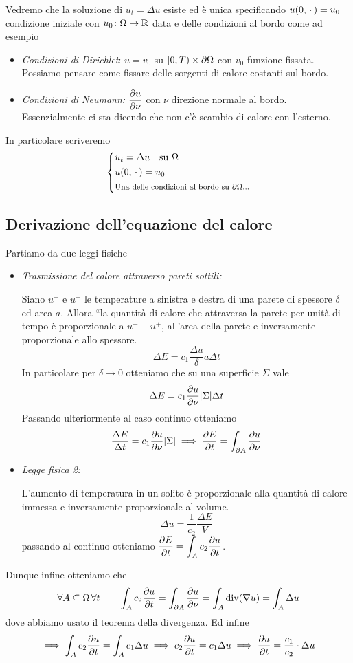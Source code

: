 Vedremo che la soluzione di $u_t = \Delta u$ esiste ed è unica specificando $u(0, \,\cdot\,) = u_0$ condizione iniziale con $u_0 \colon \Omega \to \mathbb R$ data e delle condizioni al bordo come ad esempio
\begin{itemize}
	\item \textit{Condizioni di Dirichlet}: $u = v_0$ su $[0, T) \times \partial \Omega$ con $v_0$ funzione fissata. Possiamo pensare come fissare delle sorgenti di calore costanti sul bordo.
	\item \textit{Condizioni di Neumann:} $\displaystyle \frac{\partial u}{\partial \nu}$ con $\nu$ direzione normale al bordo. Essenzialmente ci sta dicendo che non c'è scambio di calore con l'esterno.
\end{itemize}
In particolare scriveremo
$$
\left\{
\begin{aligned}
	& u_t = \Delta u \quad \text{su $\Omega$} \\
	& u(0, \,\cdot\,) = u_0 \\
	& \text{\footnotesize Una delle condizioni al bordo su $\partial \Omega$...}
\end{aligned}
\right.
$$

\subsection{Derivazione dell'equazione del calore}

Partiamo da due leggi fisiche
\begin{itemize}
	\item \textit{Trasmissione del calore attraverso pareti sottili:}

		Siano $u^-$ e $u^+$ le temperature a sinistra e destra di una parete di spessore $\delta$ ed area $a$. Allora ``la quantità di calore che attraversa la parete per unità di tempo è proporzionale a $u^- - u^+$, all'area della parete e inversamente proporzionale allo spessore.
		$$
		\Delta E = c_1 \frac{\Delta u}{\delta} a \Delta t
		$$
		In particolare per $\delta \to 0$ otteniamo che su una superficie $\Sigma$ vale
		$$
		\Delta E = c_1 \frac{\partial u}{\partial \nu} |\Sigma| \Delta t
		$$
		Passando ulteriormente al caso continuo otteniamo
		$$
		\frac{\Delta E}{\Delta t} = c_1 \frac{\partial u}{\partial \nu} |\Sigma| 
		\implies \frac{\partial E}{\partial t} = \int_{\partial A} \frac{\partial u}{\partial \nu}
		$$

	\item \textit{Legge fisica 2:}

		L'aumento di temperatura in un solito è proporzionale alla quantità di calore immessa e inversamente proporzionale al volume.
		$$
		\Delta u = \frac{1}{c_2} \frac{\Delta E}{V}
		$$
		passando al continuo otteniamo $\displaystyle \frac{\partial E}{\partial t} = \int_A c_2 \frac{\partial u}{\partial t}$.
\end{itemize}
Dunque infine otteniamo che
$$
\forall A \subseteq \Omega \, \forall t
\qquad
\int_A c_2 \frac{\partial u}{\partial t} = \int_{\partial A} \frac{\partial u}{\partial \nu} = \int_A \operatorname{div}(\nabla u) = \int_A \Delta u
$$
dove abbiamo usato il teorema della divergenza. Ed infine
$$
\implies \int_A c_2 \frac{\partial u}{\partial t} = \int_A c_1 \Delta u 
\implies c_2 \frac{\partial u}{\partial t} = c_1 \Delta u 
\implies \frac{\partial u}{\partial t} = \frac{c_1}{c_2} \cdot \Delta u
$$

